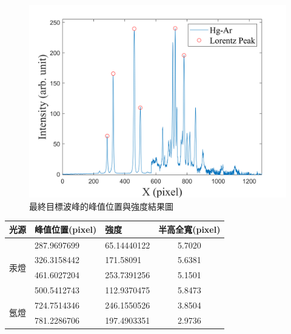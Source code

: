\begin{figure}[H] %
	\centering %
	\includegraphics[width=16cm]{figures/comebine_hg_ar_最終PEAK.png} %
	\caption{最終目標波峰的峰值位置與強度結果圖} %
	\label{最終目標波峰的峰值位置與強度結果圖} %
\end{figure}

\begin{center}
\vspace{0.8cm}
\label{最終目標波峰參數表}
\begin{tabularx}{\textwidth}{m{}<{\centering} m{}<{\centering} m{}<{\centering}c}
	\hline\hline
	光源            & 峰值位置(pixel) & 強度 & 半高全寬(pixel) \\
	\hline
    \multirow{4}{*}{汞燈 }
    &287.9697699&	65.14440122& 5.7020\\
    &326.3158442&	171.58091  & 5.6381\\
    &461.6027204&	253.7391256& 5.1501\\
    &500.5412743&	112.9370475& 5.8473\\
    \hline
    \multirow{2}{*}{氬燈 }
    &724.7514346&	246.1550526& 3.8504\\
    &781.2286706&	197.4903351& 2.9736\\                   
	\hline\hline
\end{tabularx}
\end{center}

